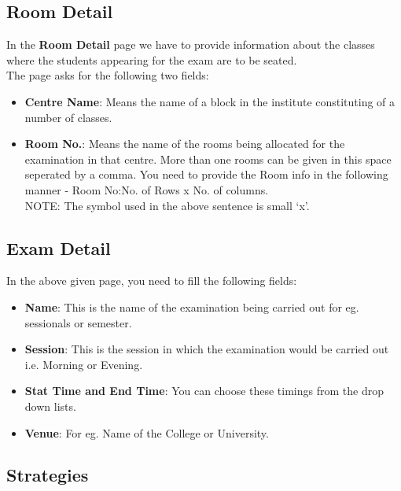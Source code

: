 \subsection{Room Detail}
 
 In the \textbf{Room Detail} page we have to provide information about 
 the classes where the students appearing for the exam are to be seated.\\
 The page asks for the following two fields:
 
 \begin{itemize}
 \item \textbf{Centre Name}: Means the name of a block in the institute 
 constituting of a number of classes.
 \item \textbf{Room No.}: Means the name of the rooms being allocated
 for the examination in that centre. More than one rooms can be given in
  this space seperated by a comma. You need to provide the Room info 
 in the following manner - Room No:No. of Rows x No. of columns.\\
 NOTE: The symbol used in the above sentence is small \lq x\rq.\\
 \end{itemize}

 
\subsection{Exam Detail}

 In the above given page, you need to fill the following fields:
\begin{itemize}
 \item \textbf{Name}: This is the name of the examination being carried 
 out for eg. sessionals or semester.
 \item \textbf{Session}: This is the session in which the examination
 would be carried out i.e. Morning or Evening.
 \item \textbf{Stat Time and End Time}: You can choose these timings
 from the drop down lists.
 \item \textbf{Venue}: For eg. Name of the College or University.
\end{itemize}

 
\subsection{Strategies}

